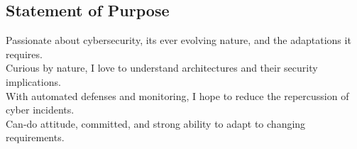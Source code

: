 \documentclass[mm, 11pt]{simple_style}
\begin{document}
\begin{resume}
\section{Statement of Purpose}

Passionate about cybersecurity, its ever evolving nature, and the adaptations it requires.\\
Curious by nature, I love to understand architectures and their security implications.\\
With automated defenses and monitoring, I hope to reduce the repercussion of cyber incidents.\\
Can-do attitude, committed, and strong ability to adapt to changing requirements.\\
%
\sectionline


\end{resume}
\end{document}

